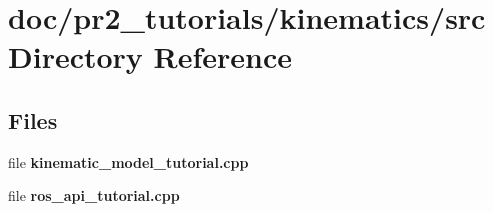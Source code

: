 \section{doc/pr2\-\_\-tutorials/kinematics/src Directory Reference}
\label{dir_02e26ed409bda26891c055ac7ba93327}
\subsection*{Files}
\begin{DoxyCompactItemize}
\item 
file {\bfseries kinematic\-\_\-model\-\_\-tutorial.\-cpp}
\item 
file {\bfseries ros\-\_\-api\-\_\-tutorial.\-cpp}
\end{DoxyCompactItemize}
